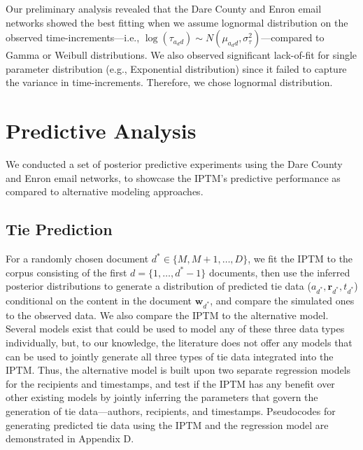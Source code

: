 \documentclass{article}
\begin{document}
Our preliminary analysis revealed that the Dare County and Enron email networks showed the best fitting when we assume lognormal distribution on the observed time-increments---i.e., $\log(\tau_{a_dd}) \sim N(\mu_{a_d d}, \sigma^2_\tau)$---compared to Gamma or Weibull distributions. We also observed significant lack-of-fit for single parameter distribution (e.g., Exponential distribution) since it failed to capture the variance in time-increments. Therefore, we chose lognormal distribution. 

\section{Predictive Analysis}\label{sec:Experiments}
We conducted a set of posterior predictive experiments using the Dare County and Enron email networks, to showcase the IPTM's predictive performance as compared to alternative modeling approaches.

\subsection{Tie Prediction}\label{subsec:Tie Prediction}
For a randomly chosen document $d^* \in \{M, M+1,\ldots, D\}$, we fit the IPTM to the corpus consisting of the first $d = \{1,\hdots,d^*-1\}$ documents, then use the inferred posterior distributions to generate a distribution of predicted tie data ($a_{d^*}, \boldsymbol{r}_{d^*}, t_{d^*}$) conditional on the content in the document $\boldsymbol{w}_{d^*}$, and compare the simulated ones to the observed data. We also compare the IPTM to the alternative model. Several models exist that could be used to model any of these three data types individually, but, to our knowledge, the literature does not offer any models that can be used to jointly generate all three types of tie data integrated into the IPTM. Thus, the alternative model is built upon two separate regression models for the recipients and timestamps, and test if the IPTM has any benefit over other existing models by jointly inferring the parameters that govern the generation of tie data---authors, recipients, and timestamps. Pseudocodes for generating predicted tie data using the IPTM and the regression model are demonstrated in Appendix D.
\end{document}
